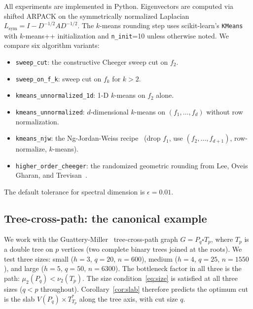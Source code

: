 \documentclass{article}
\theoremstyle{definition}
\theoremstyle{remark}
\begin{document}
All experiments are implemented in Python. Eigenvectors are computed via shifted ARPACK on the symmetrically normalized Laplacian $L_{\mathrm{sym}} = I - D^{-1/2} A D^{-1/2}$. The $k$-means rounding step uses scikit-learn's \texttt{KMeans} with $k$-means++ initialization and \texttt{n\_init}=10 unless otherwise noted. We compare six algorithm variants:
\begin{itemize}
    \item \texttt{sweep\_cut}: the constructive Cheeger sweep cut on $f_2$.
    \item \texttt{sweep\_on\_f\_k}: sweep cut on $f_k$ for $k > 2$.
    \item \texttt{kmeans\_unnormalized\_1d}: 1-D $k$-means on $f_2$ alone.
    \item \texttt{kmeans\_unnormalized}: $d$-dimensional $k$-means on $(f_1, \ldots, f_d)$ without row normalization.
    \item \texttt{kmeans\_njw}: the Ng-Jordan-Weiss recipe~\cite{ng2001spectral} (drop $f_1$, use $(f_2, \ldots, f_{d+1})$, row-normalize, $k$-means).
    \item \texttt{higher\_order\_cheeger}: the randomized geometric rounding from Lee, Oveis Gharan, and Trevisan~\cite{lee2014multiway}.
\end{itemize}
The default tolerance for spectral dimension is $\epsilon = 0.01$.

\subsection{Tree-cross-path: the canonical example}
\label{sec:tcp}

We work with the Guattery-Miller~\cite{guattery1998quality} tree-cross-path graph $G = P_q \square T_p$, where $T_p$ is a double tree on $p$ vertices (two complete binary trees joined at the roots). We test three sizes: small ($h=3$, $q=20$, $n=600$), medium ($h=4$, $q=25$, $n=1550$), and large ($h=5$, $q=50$, $n=6300$). The bottleneck factor in all three is the path: $\mu_2(P_q) < \nu_2(T_p)$. The size condition~\eqref{eq:size} is satisfied at all three sizes ($q < p$ throughout). Corollary~\ref{cor:slab} therefore predicts the optimum cut is the slab $V(P_q) \times T^*_{T_p}$ along the tree axis, with cut size $q$.
\end{document}
